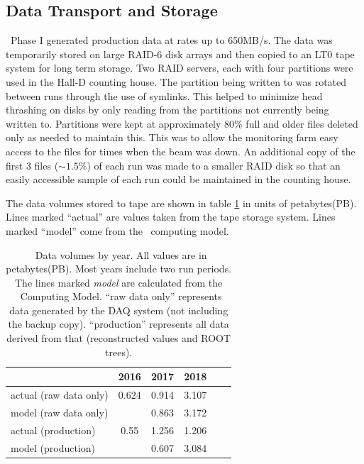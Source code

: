 \subsection{Data Transport and Storage \label{sec:onlineprocessing}}

\GX ~Phase I generated production data at rates up to 650MB/s. The data was temporarily stored on large RAID-6 disk arrays and then copied to an LT0 tape system for long term storage. Two RAID servers, each with four partitions were used in the Hall-D counting house. The partition being written to was rotated between runs through the use of symlinks. This helped to minimize head thrashing on disks by only reading from the partitions not currently being written to. Partitions were kept at approximately 80\% full and older files deleted only as needed to maintain this. This was to allow the monitoring farm easy access to the files for times when the beam was down. An additional copy of the first 3 files ($\sim1.5\%$) of each run was made to a smaller RAID disk so that an easily accessible sample of each run could be maintained in the counting house.

The data volumes stored to tape are shown in table \ref{tab:online_data_volumes} in units of petabytes(PB). Lines marked ``actual'' are values taken from the tape storage system. Lines marked ``model'' come from the \GX ~computing model\cite{gx3821}.

\begin{table}[]
    \centering
    \begin{tabular}{|l|c|c|c|c|c|}
    \hline
                           & \textbf{2016}  & \textbf{2017}  & \textbf{2018} \\
    \hline
    actual (raw data only) & 0.624 & 0.914 & 3.107 \\
    \hline
     model (raw data only) &       & 0.863 & 3.172 \\
    \hline
    \hline
    actual (production)    & 0.55  & 1.256 & 1.206 \\
    \hline
     model (production)    &       & 0.607 & 3.084 \\
    \hline
    \end{tabular}
    \caption{\GX ~Data volumes by year. All values are in petabytes(PB). Most years include two run periods. The lines marked \textit{model} are calculated from the \GX ~Computing Model\cite{gx3821}. ``raw data only'' represents data generated by the DAQ system (not including the backup copy). ``production'' represents all data derived from that (reconstructed values and ROOT trees). }
    \label{tab:online_data_volumes}
\end{table}

